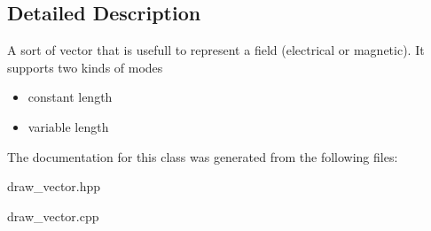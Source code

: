 \subsection{Detailed Description}
A sort of vector that is usefull to represent a field (electrical or magnetic). It supports two kinds of modes\begin{itemize}
\item constant length\item variable length \end{itemize}




The documentation for this class was generated from the following files:\begin{CompactItemize}
\item 
draw\_\-vector.hpp\item 
draw\_\-vector.cpp\end{CompactItemize}
